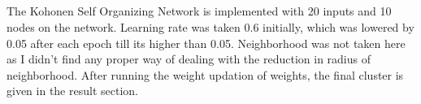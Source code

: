 \documentclass{article}
\begin{document}
    \subsection{}

    \noindent The Kohonen Self Organizing Network is implemented with 20 inputs and 10 nodes on the network. Learning rate was taken 0.6 initially, which was lowered by 0.05 after each epoch till its higher than 0.05. Neighborhood was not taken here as I didn't find any proper way of dealing with the reduction in radius of neighborhood. After running the weight updation of weights, the final cluster is given in the result section. 


\newpage

\section{}
\end{document}

